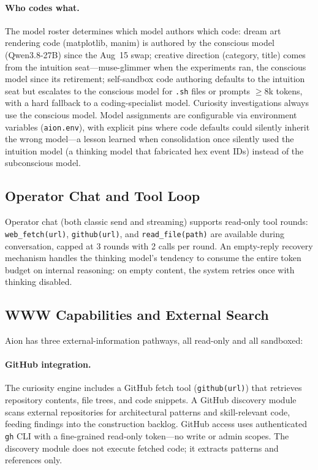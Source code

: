 \documentclass[11pt,a4paper]{article}
\begin{document}
\paragraph{Who codes what.} The model roster determines which model authors which code: dream art rendering code (matplotlib, manim) is authored by the conscious model (Qwen3.8-27B) since the Aug~15 swap; creative direction (category, title) comes from the intuition seat---muse-glimmer when the experiments ran, the conscious model since its retirement; self-sandbox code authoring defaults to the intuition seat but escalates to the conscious model for \texttt{.sh} files or prompts $\geq 8$k tokens, with a hard fallback to a coding-specialist model. Curiosity investigations always use the conscious model. Model assignments are configurable via environment variables (\texttt{aion.env}), with explicit pins where code defaults could silently inherit the wrong model---a lesson learned when consolidation once silently used the intuition model (a thinking model that fabricated hex event IDs) instead of the subconscious model.

\subsection{Operator Chat and Tool Loop}

Operator chat (both classic send and streaming) supports read-only tool rounds: \texttt{web\_fetch(url)}, \texttt{github(url)}, and \texttt{read\_file(path)} are available during conversation, capped at 3 rounds with 2 calls per round. An empty-reply recovery mechanism handles the thinking model's tendency to consume the entire token budget on internal reasoning: on empty content, the system retries once with thinking disabled.

\subsection{WWW Capabilities and External Search}
\label{sec:www}

Aion has three external-information pathways, all read-only and all sandboxed:

\paragraph{GitHub integration.} The curiosity engine includes a GitHub fetch tool (\texttt{github(url)}) that retrieves repository contents, file trees, and code snippets. A GitHub discovery module scans external repositories for architectural patterns and skill-relevant code, feeding findings into the construction backlog. GitHub access uses authenticated \texttt{gh} CLI with a fine-grained read-only token---no write or admin scopes. The discovery module does not execute fetched code; it extracts patterns and references only.
\end{document}
